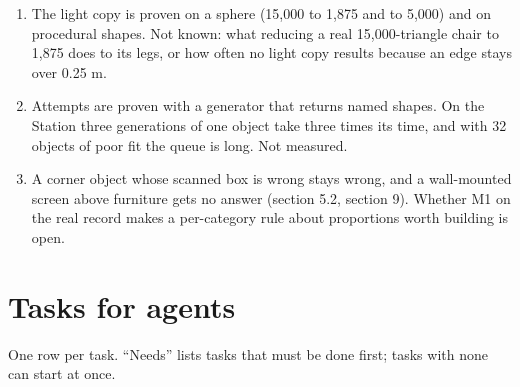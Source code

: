 \documentclass[10pt]{article}
\begin{document}
\begin{enumerate}[leftmargin=6mm]
\item The light copy is proven on a sphere (15,000 to 1,875 and to 5,000) and on procedural shapes. Not known: what reducing a real 15,000-triangle chair to 1,875 does to its legs, or how often no light copy results because an edge stays over 0.25 m.
\item Attempts are proven with a generator that returns named shapes. On the Station three generations of one object take three times its time, and with 32 objects of poor fit the queue is long. Not measured.
\item A corner object whose scanned box is wrong stays wrong, and a wall-mounted screen above furniture gets no answer (section 5.2, section 9). Whether M1 on the real record makes a per-category rule about proportions worth building is open.
\end{enumerate}

\appendix
\renewcommand{\thesection}{Appendix \Alph{section}}
\section{Tasks for agents}

One row per task. ``Needs'' lists tasks that must be done first; tasks with none can start at once.
\end{document}
